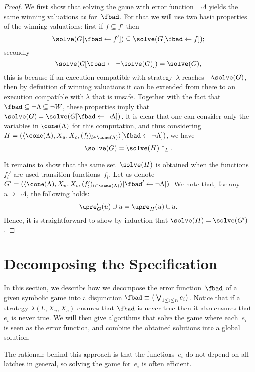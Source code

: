 \documentclass[submission,copyright,creativecommons]{eptcs}
\begin{document}
\begin{proof}
  We first show that solving the game with error function~$\lnot \Lambda$ yields
  the same winning valuations as for~$\fbad$.  For that we will use two basic
  properties of the winning valuations: first if $f \subseteq f'$ then
  \[
	  \solve(G[\fbad \leftarrow f']) \subseteq \solve(G[\fbad \leftarrow f]);
  \]
  secondly
  \[
	  \solve(G[\fbad \leftarrow \lnot \solve(G)]) = \solve(G),
  \]
  this is because if an execution compatible with strategy~$\lambda$ reaches
  $\lnot \solve(G)$, then by definition of winning valuations it can be extended
  from there to an execution compatible with $\lambda$ that is unsafe. Together
  with the fact that $\fbad \subseteq \lnot\Lambda \subseteq \lnot W$, these
  properties imply that $\solve(G) = \solve(G[\fbad \leftarrow \lnot \Lambda])$.
  It is clear that one can consider only the variables in $\cone(\Lambda)$ for
  this computation, and thus considering $H = (\langle \cone(\Lambda), X_u, X_c,
  (f_l)_{l \in \cone(\Lambda)}\rangle [\fbad \leftarrow \lnot \Lambda])$, we
  have
  \[
	  \solve(G) = \solve(H) \uparrow_L.
  \]

  It remains to show that the same set~$\solve(H)$ is obtained when the
  functions $f_l'$ are used transition functions~$f_l$.  Let us denote $G' =
  (\langle \cone(\Lambda), X_u, X_c, (f_l')_{l \in \cone(\Lambda)}\rangle
  [\fbad' \leftarrow \lnot \Lambda])$.  We note that, for any $u \supseteq \lnot
  \Lambda$, the following holds:
  \[
	  \upre_G'(u) \cup u = \upre_H(u) \cup u.
  \]
  Hence, it is straightforward to show by induction that $\solve(H) =
  \solve(G')$.
\end{proof}

\section{Decomposing the Specification}\label{sec:decomp}
In this section, we describe how we decompose the error function~$\fbad$
of a given symbolic game into a disjunction \textit{\ie}
$\fbad \equiv \big(\bigvee_{1 \leq i \leq n} e_i\big)$.
Notice that if a strategy $\lambda(L, X_u, X_c)$ ensures
that $\fbad$ is never true then it also ensures that $e_i$
is never true.  We will then give algorithms that solve the game where
each~$e_i$ is seen as the error function, and combine the obtained solutions
into a global solution. 

The rationale behind this approach is that the functions~$e_i$ do not depend on
all latches in general, so solving the game for~$e_i$ is often efficient.
\end{document}
